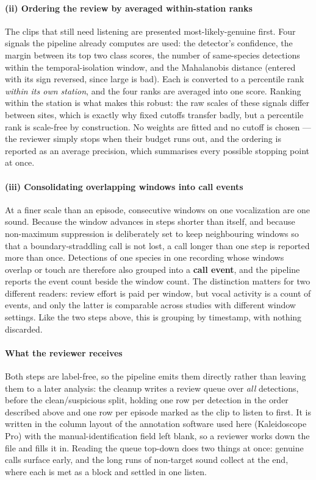 \documentclass[final,3p,times]{elsarticle}
\begin{document}
\paragraph{(ii) Ordering the review by averaged within-station ranks}
The clips that still need listening are presented most-likely-genuine first.
Four signals the pipeline already computes are used: the detector's confidence,
the margin between its top two class scores, the number of same-species
detections within the temporal-isolation window, and the Mahalanobis distance
(entered with its sign reversed, since large is bad). Each is converted to a
percentile rank \emph{within its own station}, and the four ranks are averaged
into one score. Ranking within the station is what makes this robust: the raw
scales of these signals differ between sites, which is exactly why fixed
cutoffs transfer badly, but a percentile rank is scale-free by construction.
No weights are fitted and no cutoff is chosen --- the reviewer simply stops when
their budget runs out, and the ordering is reported as an average precision,
which summarises every possible stopping point at once.

\paragraph{(iii) Consolidating overlapping windows into call events}
At a finer scale than an episode, consecutive windows on one vocalization are one
sound. Because the window advances in steps shorter than itself, and because
non-maximum suppression is deliberately set to keep neighbouring windows so that
a boundary-straddling call is not lost, a call longer than one step is reported
more than once. Detections of one species in one recording whose windows overlap
or touch are therefore also grouped into a \textbf{call event}, and the pipeline
reports the event count beside the window count. The distinction matters for two
different readers: review effort is paid per window, but vocal activity is a
count of events, and only the latter is comparable across studies with different
window settings. Like the two steps above, this is grouping by timestamp, with
nothing discarded.

\paragraph{What the reviewer receives}
Both steps are label-free, so the pipeline emits them directly rather than
leaving them to a later analysis: the cleanup writes a review queue over
\emph{all} detections, before the clean/suspicious split, holding one row per
detection in the order described above and one row per episode marked as the
clip to listen to first. It is written in the column layout of the annotation
software used here (Kaleidoscope Pro) with the manual-identification field left
blank, so a reviewer works down the file and fills it in. Reading the queue
top-down does two things at once: genuine calls surface early, and the long runs
of non-target sound collect at the end, where each is met as a block and settled
in one listen.
\end{document}
